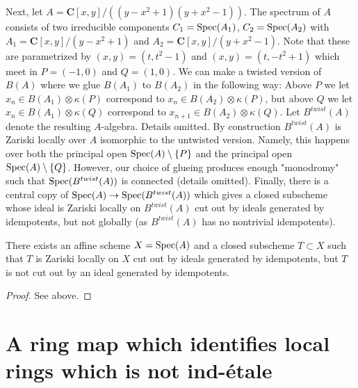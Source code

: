 \medskip\noindent
Next, let $A = \mathbf{C}[x, y]/((y - x^2 + 1)(y + x^2 - 1))$.
The spectrum of $A$ consists of two irreducible components
$C_1 = \mathop{\mathrm{Spec}}(A_1)$, $C_2 = \mathop{\mathrm{Spec}}(A_2)$
with $A_1 = \mathbf{C}[x, y]/(y - x^2 + 1)$ and
$A_2 = \mathbf{C}[x, y]/(y + x^2 - 1)$. Note that these are
parametrized by $(x, y) = (t, t^2 - 1)$ and $(x, y) = (t, -t^2 + 1)$
which meet in $P = (-1, 0)$ and $Q = (1, 0)$. We can make a twisted
version of $B(A)$ where we glue $B(A_1)$ to $B(A_2)$ in the following
way: Above $P$ we let $x_n \in B(A_1) \otimes \kappa(P)$
correspond to $x_n \in B(A_2) \otimes \kappa(P)$, but above $Q$
we let $x_n \in B(A_1) \otimes \kappa(Q)$
correspond to $x_{n + 1} \in B(A_2) \otimes \kappa(Q)$.
Let $B^{twist}(A)$ denote the resulting $A$-algebra.
Details omitted. By construction
$B^{twist}(A)$ is Zariski locally over $A$ isomorphic to the untwisted
version. Namely, this happens over both the principal open
$\mathop{\mathrm{Spec}}(A) \setminus \{P\}$
and the principal open $\mathop{\mathrm{Spec}}(A) \setminus \{Q\}$.
However, our choice of glueing produces enough "monodromy" such that
$\mathop{\mathrm{Spec}}(B^{twist}(A))$ is connected (details omitted).
Finally, there is a central copy of
$\mathop{\mathrm{Spec}}(A) \to \mathop{\mathrm{Spec}}(B^{twist}(A))$
which gives a closed subscheme whose ideal is Zariski locally
on $B^{twist}(A)$ cut out by ideals generated by idempotents, but
not globally (as $B^{twist}(A)$ has no nontrivial idempotents).

\begin{lemma}
\label{lemma-not-generated-idempotents}
There exists an affine scheme $X = \mathop{\mathrm{Spec}}(A)$ and a
closed subscheme $T \subset X$ such that $T$ is Zariski locally
on $X$ cut out by ideals generated by idempotents, but
$T$ is not cut out by an ideal generated by idempotents.
\end{lemma}

\begin{proof}
See above.
\end{proof}



\section{A ring map which identifies local rings which is not ind-\'etale}
\label{section-not-ind-etale}

